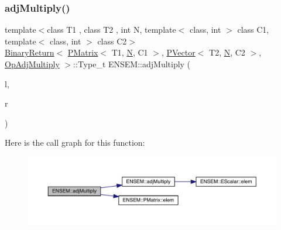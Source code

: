 \subsubsection{\texorpdfstring{adjMultiply()}{adjMultiply()}\hspace{0.1cm}{\footnotesize\ttfamily [2/2]}}
{\footnotesize\ttfamily template$<$class T1 , class T2 , int N, template$<$ class, int $>$ class C1, template$<$ class, int $>$ class C2$>$ \\
\mbox{\hyperlink{structENSEM_1_1BinaryReturn}{Binary\+Return}}$<$ \mbox{\hyperlink{classENSEM_1_1PMatrix}{P\+Matrix}}$<$ T1, \mbox{\hyperlink{operator__name__util_8cc_a7722c8ecbb62d99aee7ce68b1752f337}{N}}, C1 $>$, \mbox{\hyperlink{classENSEM_1_1PVector}{P\+Vector}}$<$ T2, \mbox{\hyperlink{operator__name__util_8cc_a7722c8ecbb62d99aee7ce68b1752f337}{N}}, C2 $>$, \mbox{\hyperlink{structENSEM_1_1OpAdjMultiply}{Op\+Adj\+Multiply}} $>$\+::Type\+\_\+t E\+N\+S\+E\+M\+::adj\+Multiply (\begin{DoxyParamCaption}\item[{const \mbox{\hyperlink{classENSEM_1_1PMatrix}{P\+Matrix}}$<$ T1, \mbox{\hyperlink{operator__name__util_8cc_a7722c8ecbb62d99aee7ce68b1752f337}{N}}, C1 $>$ \&}]{l,  }\item[{const \mbox{\hyperlink{classENSEM_1_1PVector}{P\+Vector}}$<$ T2, \mbox{\hyperlink{operator__name__util_8cc_a7722c8ecbb62d99aee7ce68b1752f337}{N}}, C2 $>$ \&}]{r }\end{DoxyParamCaption})\hspace{0.3cm}{\ttfamily [inline]}}

Here is the call graph for this function\+:\nopagebreak
\begin{figure}[H]
\begin{center}
\leavevmode
\includegraphics[width=350pt]{d3/dc4/group__primvector_ga1728ca784073c199bee500323e8ae96e_cgraph}
\end{center}
\end{figure}
\mbox{\label{group__primvector_ga4b7fc81e0d4329f6c328adee1c9daf7e}} 
